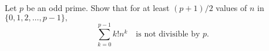 Let $p$ be an odd prime. Show that for at least $(p+1)/2$ values of $n$ in $\{0,1,2,\dots,p-1\},$
\[\sum_{k=0}^{p-1}k!n^k \quad \text{is not divisible by }p.\]